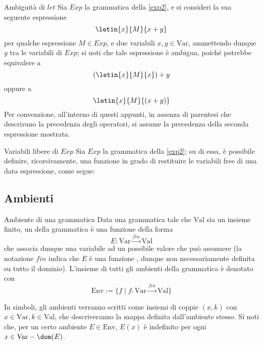 \documentclass[a4paper, 12pt]{report}
\begin{document}
    \begin{framedobs}{Ambiguità di $let$}
        Sia $Exp$ la grammatica della \cref{exp2}, e si consideri la sua seguente espressione $$\letin{x}{M}{x + y}$$ per qualche espressione $M \in Exp$, e due variabili $x, y \in \mathrm{Var}$, ammettendo dunque $y$ tra le variabili di $Exp$; si noti che tale espressione è ambigua, poiché potrebbe equivalere a $$(\letin{x}{M}{x}) + y$$ oppure a $$\letin{x}{M}{(x + y)}$$ Per convenzione, all'interno di questi appunti, in assenza di parentesi che descrivano la precedenza degli operatori, si assume la precedenza della seconda espressione mostrata.
    \end{framedobs}

    \begin{framedobs}{Variabili libere di $Exp$}
        Sia $Exp$ la grammatica della \cref{exp2}; su di essa, è possibile definire, ricorsivamente, una funzione in grado di restituire le variabili free di una data espressione, come segue: 
    \end{framedobs}

    \subsection{Ambienti}
    
    \begin{frameddefn}[label={env}]{Ambiente di una grammatica}
        Data una grammatica tale che $\mathrm{Val}$ sia un insieme finito, un  della grammatica è una funzione della forma $$E: \mathrm{Var} \xrightarrow{fin} \mathrm{Val}$$ che associa dunque una variabile ad un possibile valore che può assumere (la notazione $fin$ indica che $E$ è una funzione , dunque non necessariamente definita su tutto il dominio). L'insieme di tutti gli ambienti della grammatica è denotato con $$\mathrm{Env} := \{f \mid f : \mathrm{Var} \xrightarrow{fin} \mathrm{Val} \}$$

        In simboli, gli ambienti verranno scritti come insiemi di coppie $(x, k)$ con $x \in \mathrm{Var}, k \in \mathrm{Val}$, che descriveranno la mappa definita dall'ambiente stesso. Si noti che, per un certo ambiente $E \in \mathrm{Env}$, $E(x)$ è indefinito per ogni $x \in \mathrm{Var} - \dom(E)$.
    \end{frameddefn}
\end{document}
